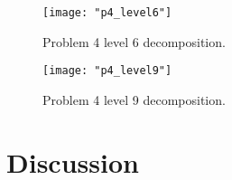\documentclass[./rarnold_report5.tex]{subfiles}
\begin{document}
	\clearpage
	
	\begin{figure}[!htbp]
	\centering
	\texttt{[image: "p4\_level6"]}
	\captionsetup{justification=centering}
	\caption{Problem 4 level 6 decomposition.} 
	\label{p4l6}
	\end{figure}
	
	\clearpage
	
	\begin{figure}[!htbp]
	\centering
	\texttt{[image: "p4\_level9"]}
	\captionsetup{justification=centering}
	\caption{Problem 4 level 9 decomposition.} 
	\label{p4l9}
	\end{figure}
  	
\clearpage
\section*{Discussion}
\end{document}
